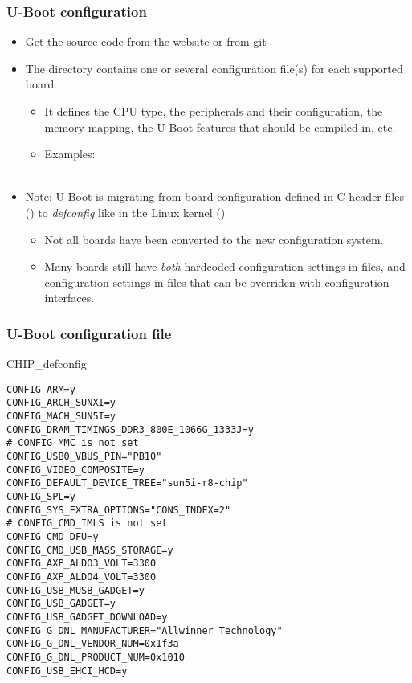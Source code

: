 \begin{frame}
  \frametitle{U-Boot configuration}
  \begin{itemize}
  \item Get the source code from the website or from git
  \item The  directory contains one or several
        configuration file(s) for each supported board
    \begin{itemize}
    \item It defines the CPU type, the peripherals and their configuration, the
      memory mapping, the U-Boot features that should be compiled in, etc.
     \item Examples:\\
           \\
    \end{itemize}
  \item Note: U-Boot is migrating from board configuration defined in
    C header files () to {\em defconfig} like in
    the Linux kernel ()
    \begin{itemize}
    \item Not all boards have been converted to the new configuration
      system.
    \item Many boards still have {\em both} hardcoded configuration settings in
           files, and configuration settings in 
          files that can be overriden with configuration interfaces.
    \end{itemize}
  \end{itemize}
\end{frame}

\begin{frame}[fragile]
  \frametitle{U-Boot configuration file}
\begin{block}{CHIP\_defconfig}
\begin{Verbatim}[formatcom=\tiny\ttfamily]
CONFIG_ARM=y
CONFIG_ARCH_SUNXI=y
CONFIG_MACH_SUN5I=y
CONFIG_DRAM_TIMINGS_DDR3_800E_1066G_1333J=y
# CONFIG_MMC is not set
CONFIG_USB0_VBUS_PIN="PB10"
CONFIG_VIDEO_COMPOSITE=y
CONFIG_DEFAULT_DEVICE_TREE="sun5i-r8-chip"
CONFIG_SPL=y
CONFIG_SYS_EXTRA_OPTIONS="CONS_INDEX=2"
# CONFIG_CMD_IMLS is not set
CONFIG_CMD_DFU=y
CONFIG_CMD_USB_MASS_STORAGE=y
CONFIG_AXP_ALDO3_VOLT=3300
CONFIG_AXP_ALDO4_VOLT=3300
CONFIG_USB_MUSB_GADGET=y
CONFIG_USB_GADGET=y
CONFIG_USB_GADGET_DOWNLOAD=y
CONFIG_G_DNL_MANUFACTURER="Allwinner Technology"
CONFIG_G_DNL_VENDOR_NUM=0x1f3a
CONFIG_G_DNL_PRODUCT_NUM=0x1010
CONFIG_USB_EHCI_HCD=y
\end{Verbatim}
\end{block}
\end{frame}

